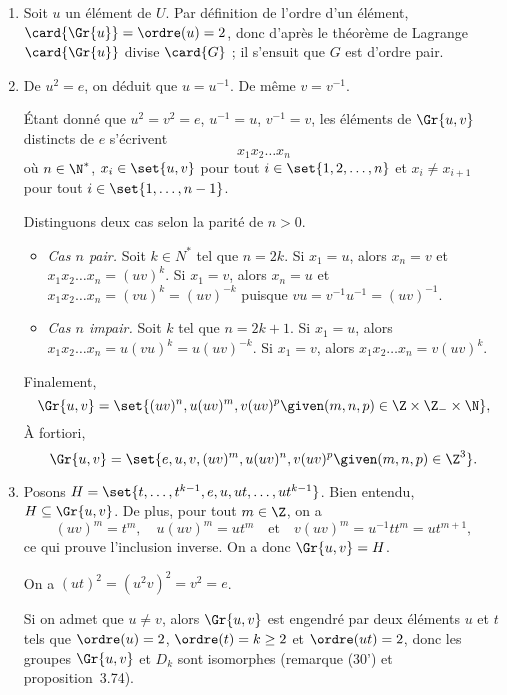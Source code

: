 
\begin{enumerate}
  \item %
    Soit $u$ un élément de $U$.
    Par définition de l'ordre d'un élément, $\card{\Gr{u}} = \ordre(u) = 2$, donc d'après le théorème de Lagrange $\card{\Gr{u}}$ divise $\card{G}$ ;
    il s'ensuit que $G$ est d'ordre pair.

  \item %
    De $u^2 = e$, on déduit que $u = u^{-1}$.
    De même $v = v^{-1}$.

    Étant donné que $u^2 = v^2 = e$, $u^{-1} = u$, $v^{-1} = v$, les éléments de $\Gr{u, v}$ distincts de $e$ s'écrivent
    \[
      x_1x_2\dots x_n
    \]
    où $n\in\N^*$, $x_i\in\set{u, v}$ pour tout $i\in\set{1, 2, \dots, n}$ et $x_i\neq x_{i + 1}$ pour tout $i\in\set{1, \dots, n - 1}$.

    Distinguons deux cas selon la parité de $n > 0$.
    \begin{itemize}
      \item
        \emph{Cas $n$ pair.}
        Soit $k\in N^*$ tel que $n = 2k$.
        Si $x_1 = u$, alors $x_n = v$ et $x_1x_2\dots x_n = (uv)^k$.
        Si $x_1 = v$, alors $x_n = u$ et $x_1x_2\dots x_n = (vu)^k = (uv)^{-k}$ puisque $vu = v^{-1}u^{-1} = (uv)^{-1}$.

      \item
        \emph{Cas $n$ impair.}
        Soit $k$ tel que $n = 2k + 1$.
        Si $x_1 = u$, alors $x_1x_2\dots x_n = u(vu)^k = u(uv)^{-k}$.
        Si $x_1 = v$, alors $x_1x_2\dots x_n = v(uv)^k$.
    \end{itemize}

    Finalement,
    \[
      \Gr{u, v} = \set{(uv)^n, u(uv)^m, v(uv)^p \given (m, n, p)\in\Z\times\Z_-\times\N},
    \]
    À fortiori,
    \[
      \Gr{u, v} = \set{e, u, v, (uv)^m, u(uv)^n, v(uv)^p \given (m, n, p)\in\Z^3}.
    \]

    \item %
      Posons $H = \set{t, \dots, t^{k - 1}, e, u, ut, \dots, ut^{k - 1}}$.
      Bien entendu, $H\subseteq\Gr{u, v}$.
      De plus, pour tout $m\in\Z$, on a
      \[
        (uv)^m = t^m, \quad u(uv)^m = ut^m \quad\text{et}\quad v(uv)^m = u^{-1}t t^m = ut^{m + 1},
      \]
      ce qui prouve l'inclusion inverse.
      On a donc $\Gr{u, v} = H$.

      On a $(ut)^2 = (u^2v)^2 = v^2 = e$.

      Si on admet que $u\neq v$, alors $\Gr{u, v}$ est engendré par deux éléments $u$ et $t$ tels que $\ordre(u) = 2$, $\ordre(t) = k \geq 2$ et $\ordre(ut) = 2$, donc les groupes $\Gr{u, v}$ et $D_k$ sont isomorphes (remarque (30') et proposition~3.74).
  \end{enumerate}
